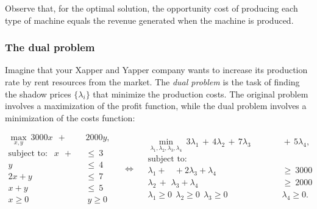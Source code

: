 \documentclass[11pt,oneside]{article}
\begin{document}
			Observe that, for the optimal solution, 
			the opportunity cost of producing each type of machine equals the revenue generated when the machine is produced.

			


			

		\subsubsection{The dual problem}			

			Imagine that your Xapper and Yapper company wants to increase its production rate by rent resources from the market.
			The \emph{dual problem} is the task of finding the shadow prices $\{\lambda_i\}$ that minimize the production costs.
			The original problem involves a maximization of the profit function,
			while the dual problem involves a minimization of the costs function:
			
			{\footnotesize 
	 		\[
	 			\begin{array}{rl}
				\max_{x,y}  \  3000x  \ \ + & \!\!\!\!2000y,   \\[1mm]
				\textrm{subject to:  } \ \
						x  \ \ +   \ \ 		\ &\leq \		3	\\
							y	\ &\leq \	 	4	\\
						2x	+ y	\ &\leq \	 	7	\\
						x 	+ y	\ &\leq \	 	5	\\
						x \geq 0 \!\!\!& \ y \geq 0
	 			\end{array}
			\quad
	 		\Leftrightarrow
			\quad
	 			\begin{array}{rl}
				{\displaystyle \min_{\lambda_1,\lambda_2,\lambda_3,\lambda_4}} \  3\lambda_1 \, + \,  4\lambda_2 \, + \,  7\lambda_3 \! & \!\!\! + \,  5\lambda_4, \\[3mm]
				\textrm{subject to:  }   \qquad \qquad \qquad \qquad \qquad   \\
						\lambda_1 + \ \ \  \ + 2\lambda_3 + \lambda_4   		\ &\geq \		3000	\\
						          \lambda_2 \, + \,\, \lambda_3 + \lambda_4   		\ &\geq \		2000	\\
						\lambda_1 \geq 0 \ \  \lambda_2 \geq 0 \ \  \lambda_3 \geq 0  & \!\! \lambda_4 \geq 0.
	 			\end{array}
	 		\]}%
	
\end{document}
